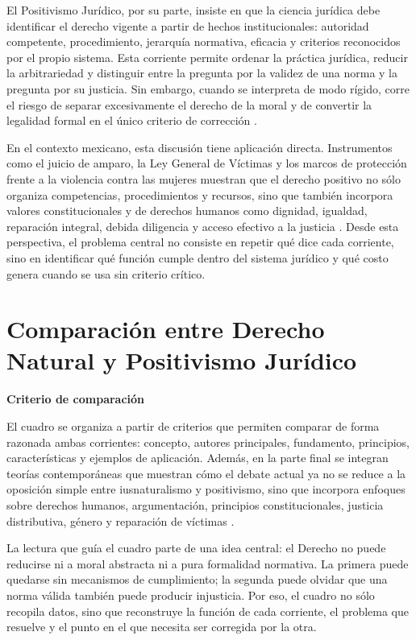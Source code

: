 \documentclass[
	spanish, %
	letterpaper, oneside
]{article}
\begin{document}
El Positivismo Jurídico, por su parte, insiste en que la ciencia jurídica debe identificar el derecho vigente a partir de hechos institucionales: autoridad competente, procedimiento, jerarquía normativa, eficacia y criterios reconocidos por el propio sistema. Esta corriente permite ordenar la práctica jurídica, reducir la arbitrariedad y distinguir entre la pregunta por la validez de una norma y la pregunta por su justicia. Sin embargo, cuando se interpreta de modo rígido, corre el riesgo de separar excesivamente el derecho de la moral y de convertir la legalidad formal en el único criterio de corrección \citep{rojas-gonzalezFilosofiaDerecho2018,ruizrodriguezFilosofiaDerecho2009}.

En el contexto mexicano, esta discusión tiene aplicación directa. Instrumentos como el juicio de amparo, la Ley General de Víctimas y los marcos de protección frente a la violencia contra las mujeres muestran que el derecho positivo no sólo organiza competencias, procedimientos y recursos, sino que también incorpora valores constitucionales y de derechos humanos como dignidad, igualdad, reparación integral, debida diligencia y acceso efectivo a la justicia \citep{LeyAmparoReglamentaria,LeyGeneralVictimas,franzoniacevedoLeyGeneralAcceso2017}. Desde esta perspectiva, el problema central no consiste en repetir qué dice cada corriente, sino en identificar qué función cumple dentro del sistema jurídico y qué costo genera cuando se usa sin criterio crítico.

\section{Comparación entre Derecho Natural y Positivismo Jurídico}

\textbf{Criterio de comparación}

El cuadro se organiza a partir de criterios que permiten comparar de forma razonada ambas corrientes: concepto, autores principales, fundamento, principios, características y ejemplos de aplicación. Además, en la parte final se integran teorías contemporáneas que muestran cómo el debate actual ya no se reduce a la oposición simple entre iusnaturalismo y positivismo, sino que incorpora enfoques sobre derechos humanos, argumentación, principios constitucionales, justicia distributiva, género y reparación de víctimas \citep{rojas-gonzalezFilosofiaDerecho2018,lovonManualPracticoFilosofia2020}.

La lectura que guía el cuadro parte de una idea central: el Derecho no puede reducirse ni a moral abstracta ni a pura formalidad normativa. La primera puede quedarse sin mecanismos de cumplimiento; la segunda puede olvidar que una norma válida también puede producir injusticia. Por eso, el cuadro no sólo recopila datos, sino que reconstruye la función de cada corriente, el problema que resuelve y el punto en el que necesita ser corregida por la otra.
\end{document}
